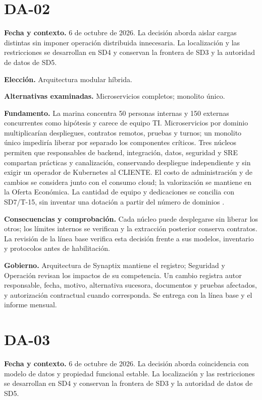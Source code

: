 \documentclass[11pt,letterpaper]{report}
\begin{document}
\section*{DA-02}

\textbf{Fecha y contexto.} 6 de octubre de 2026. La decisión aborda aislar cargas distintas sin imponer operación distribuida innecesaria. La localización y las restricciones se desarrollan en SD4 y conservan la frontera de SD3 y la autoridad de datos de SD5.

\textbf{Elección.} Arquitectura modular híbrida.

\textbf{Alternativas examinadas.} Microservicios completos; monolito único.

\textbf{Fundamento.} La marina concentra 50 personas internas y 150 externas concurrentes como hipótesis y carece de equipo TI. Microservicios por dominio multiplicarían despliegues, contratos remotos, pruebas y turnos; un monolito único impediría liberar por separado los componentes críticos. Tres núcleos permiten que responsables de backend, integración, datos, seguridad y SRE compartan prácticas y canalización, conservando despliegue independiente y sin exigir un operador de Kubernetes al CLIENTE. El costo de administración y de cambios se considera junto con el consumo cloud; la valorización se mantiene en la Oferta Económica. La cantidad de equipo y dedicaciones se concilia con SD7/T-15, sin inventar una dotación a partir del número de dominios \parencite[sec.~2.3, p.~7]{pucv-transversal}.

\textbf{Consecuencias y comprobación.} Cada núcleo puede desplegarse sin liberar los otros; los límites internos se verifican y la extracción posterior conserva contratos. La revisión de la línea base verifica esta decisión frente a sus modelos, inventario y protocolos antes de habilitación.

\textbf{Gobierno.} Arquitectura de Synaptix mantiene el registro; Seguridad y Operación revisan los impactos de su competencia. Un cambio registra autor responsable, fecha, motivo, alternativa sucesora, documentos y pruebas afectados, y autorización contractual cuando corresponda. Se entrega con la línea base y el informe mensual.

\section*{DA-03}

\textbf{Fecha y contexto.} 6 de octubre de 2026. La decisión aborda coincidencia con modelo de datos y propiedad funcional estable. La localización y las restricciones se desarrollan en SD4 y conservan la frontera de SD3 y la autoridad de datos de SD5.
\end{document}
